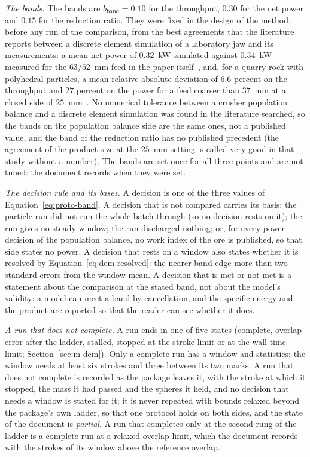 \emph{The bands.} The bands are $b_{\mathrm{band}}=0.10$ for the throughput, $0.30$ for the net power and $0.15$ for the reduction ratio. They were fixed in the design of the method, before any run of the comparison, from the best agreements that the literature reports between a discrete element simulation of a laboratory jaw and its measurements: a mean net power of $0.32$~kW simulated against $0.34$~kW measured for the $63/52$~mm feed in the paper itself~\cite{barrios2020}, and, for a quarry rock with polyhedral particles, a mean relative absolute deviation of $6.6$ percent on the throughput and $27$ percent on the power for a feed coarser than $37$~mm at a closed side of $25$~mm~\cite{tino2026}. No numerical tolerance between a crusher population balance and a discrete element simulation was found in the literature searched, so the bands on the population balance side are the same ones, not a published value, and the band of the reduction ratio has no published precedent (the agreement of the product size at the $25$~mm setting is called very good in that study without a number). The bands are set once for all three points and are not tuned: the document records when they were set.

\emph{The decision rule and its bases.} A decision is one of the three values of Equation~\eqref{eq:proto-band}. A decision that is not compared carries its basis: the particle run did not run the whole batch through (so no decision rests on it); the run gives no steady window; the run discharged nothing; or, for every power decision of the population balance, no work index of the ore is published, so that side states no power. A decision that rests on a window also states whether it is resolved by Equation~\eqref{eq:dem-resolved}: the nearer band edge more than two standard errors from the window mean. A decision that is met or not met is a statement about the comparison at the stated band, not about the model's validity: a model can meet a band by cancellation, and the specific energy and the product are reported so that the reader can see whether it does.

\emph{A run that does not complete.} A run ends in one of five states (complete, overlap error after the ladder, stalled, stopped at the stroke limit or at the wall-time limit; Section~\ref{sec:m-dem}). Only a complete run has a window and statistics; the window needs at least six strokes and three between its two marks. A run that does not complete is recorded as the package leaves it, with the stroke at which it stopped, the mass it had passed and the spheres it held, and no decision that needs a window is stated for it; it is never repeated with bounds relaxed beyond the package's own ladder, so that one protocol holds on both sides, and the state of the document is \emph{partial}. A run that completes only at the second rung of the ladder is a complete run at a relaxed overlap limit, which the document records with the strokes of its window above the reference overlap.

